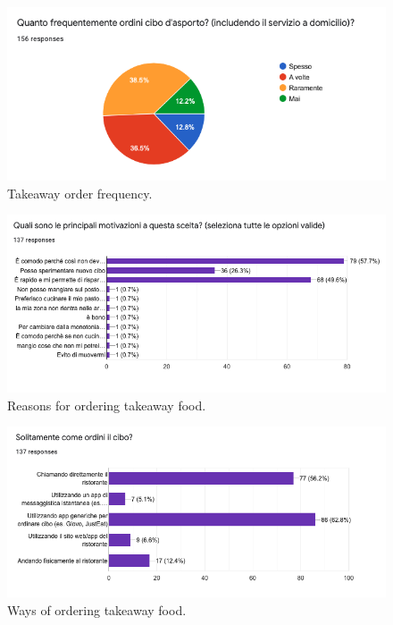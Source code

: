 \begin{figure}[h]
    \centering
    \includegraphics[scale=0.5]{images/q_freq.png}
    \caption{Takeaway order frequency.}
    \label{fig:q_freq}
\end{figure}

\begin{figure}[h]
    \centering
    \includegraphics[scale=0.5]{images/q_r1.png}
    \caption{Reasons for ordering takeaway food.}
    \label{fig:q_r1}
\end{figure}

\begin{figure}[h]
    \centering
    \includegraphics[scale=0.5]{images/q_h.png}
    \caption{Ways of ordering takeaway food.}
    \label{fig:q_h}
\end{figure}

